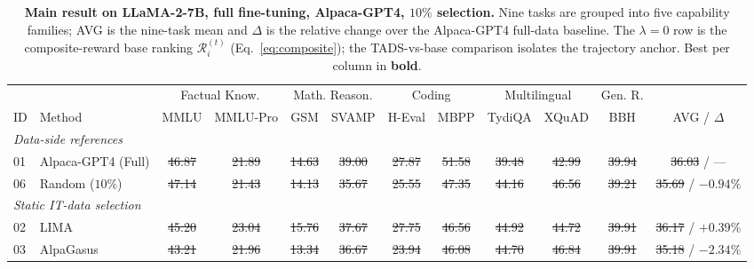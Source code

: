 \begin{table}[t]
\centering
\caption{\textbf{Main result on LLaMA-2-7B, full fine-tuning,
Alpaca-GPT4, $10\%$ selection.} Nine tasks are grouped into five
capability families; AVG is the nine-task mean and $\Delta$ is the
relative change over the Alpaca-GPT4 full-data baseline. The
$\lambda=0$ row is the composite-reward base ranking
$\mathcal{R}_i^{(t)}$ (Eq.~\ref{eq:composite}); the
\textsc{TADS}-vs-base comparison isolates the trajectory anchor.
Best per column in \textbf{bold}. }
\label{tab:main}
\small
\setlength{\tabcolsep}{4pt}
\begin{tabular}{llcccccccccc}
\toprule
 & & \multicolumn{2}{c}{Factual Know.}
   & \multicolumn{2}{c}{Math. Reason.}
   & \multicolumn{2}{c}{Coding}
   & \multicolumn{2}{c}{Multilingual}
   & Gen. R. & \\
\cmidrule(lr){3-4}\cmidrule(lr){5-6}\cmidrule(lr){7-8}\cmidrule(lr){9-10}\cmidrule(lr){11-11}
ID & Method & MMLU & MMLU-Pro & GSM & SVAMP & H-Eval & MBPP
   & TydiQA & XQuAD & BBH & AVG / $\Delta$ \\
\midrule
\multicolumn{12}{l}{\textit{Data-side references}}\\
01 & Alpaca-GPT4 (Full)
& \sout{46.87} & \sout{21.89} & \sout{14.63} & \sout{39.00}
& \sout{27.87} & \sout{51.58} & \sout{39.48} & \sout{42.99}
& \sout{39.94} & \sout{36.03} / --- \\

06 & Random ($10\%$)
& \sout{47.14} & \sout{21.43} & \sout{14.13} & \sout{35.67}
& \sout{25.55} & \sout{47.35} & \sout{44.16} & \sout{46.56}
& \sout{39.21} & \sout{35.69} / \sout{$-0.94\%$} \\

\midrule
\multicolumn{12}{l}{\textit{Static IT-data selection}}\\
02 & LIMA
& \sout{45.20} & \sout{23.04} & \sout{15.76} & \sout{37.67}
& \sout{27.75} & \sout{46.56} & \sout{44.92} & \sout{44.72}
& \sout{39.91} & \sout{36.17} / \sout{$+0.39\%$} \\

03 & AlpaGasus
& \sout{43.21} & \sout{21.96} & \sout{13.34} & \sout{36.67}
& \sout{23.94} & \sout{46.08} & \sout{44.70} & \sout{46.84}
& \sout{39.91} & \sout{35.18} / \sout{$-2.34\%$} \\


\end{tabular}
\end{table}
